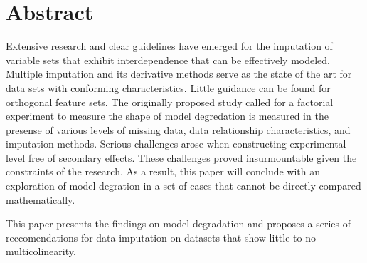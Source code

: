 \documentclass[../paper.tex]{subfiles}
\begin{document}
\section{Abstract}

Extensive research and clear guidelines have emerged for the imputation
of variable sets that exhibit interdependence that can be effectively modeled.
Multiple imputation and its derivative methods serve as the state of the art for
data sets with conforming characteristics. Little guidance can be found
for orthogonal feature sets. The originally proposed study called for a factorial experiment
to measure the shape of model degredation is measured in the presense of various levels of missing data, data relationship characteristics, and imputation methods.
Serious challenges arose when constructing experimental level free of secondary effects.
These challenges proved insurmountable given the constraints of the research.
As a result, this paper will conclude with an exploration of model degration in a set of cases that cannot be directly compared mathematically.

This paper presents the findings on model degradation and proposes a series of
reccomendations for data imputation on datasets that show little to no multicolinearity.

\end{document}
